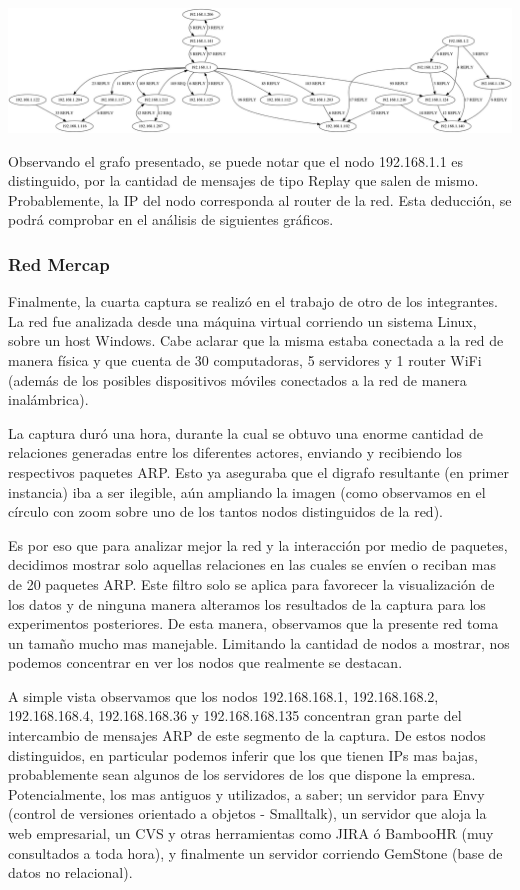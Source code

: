 \begin{center}
\includegraphics[angle=90, scale=0.2]{./graficos/grafos-arp/grafo_laburo_mari.png}
\end{center}

Observando el grafo presentado, se puede notar que el nodo 192.168.1.1 es distinguido, por la cantidad de mensajes de tipo Replay que salen de mismo. Probablemente, la IP del nodo corresponda al router de la red. Esta  deducción, se podrá comprobar en el análisis de siguientes gráficos.

\subsubsection{Red Mercap}
Finalmente, la cuarta captura se realizó en el trabajo de otro de los integrantes. La red fue analizada desde una máquina virtual corriendo un sistema Linux, sobre un host Windows. Cabe aclarar que la misma estaba conectada a la red de manera física y que cuenta de 30 computadoras, 5 servidores y 1 router WiFi (además de los posibles dispositivos móviles conectados a la red de manera inalámbrica).

La captura duró una hora, durante la cual se obtuvo una enorme cantidad de relaciones generadas entre los diferentes actores, enviando y recibiendo los respectivos paquetes ARP. Esto ya aseguraba que el digrafo resultante (en primer instancia) iba a ser ilegible, aún ampliando la imagen (como observamos en el círculo con zoom sobre uno de los tantos nodos distinguidos de la red). 

Es por eso que para analizar mejor la red y la interacción por medio de paquetes, decidimos mostrar solo aquellas relaciones en las cuales se envíen o reciban mas de 20 paquetes ARP. Este filtro solo se aplica para favorecer la visualización de los datos y de ninguna manera alteramos los resultados de la captura para los experimentos posteriores. De esta manera, observamos que la presente red toma un tamaño mucho mas manejable. Limitando la cantidad de nodos a mostrar, nos podemos concentrar en ver los nodos que realmente se destacan.

A simple vista observamos que los nodos 192.168.168.1, 192.168.168.2, 192.168.168.4, 192.168.168.36 y 192.168.168.135 concentran gran parte del intercambio de mensajes ARP de este segmento de la captura. De estos nodos distinguidos, en particular podemos inferir que los que tienen IPs mas bajas, probablemente sean algunos de los servidores de los que dispone la empresa. Potencialmente, los mas antiguos y utilizados, a saber; un servidor para Envy (control de versiones orientado a objetos - Smalltalk), un servidor que aloja la web empresarial, un CVS y otras herramientas como JIRA ó BambooHR (muy consultados a toda hora), y finalmente un servidor corriendo GemStone (base de datos no relacional).

